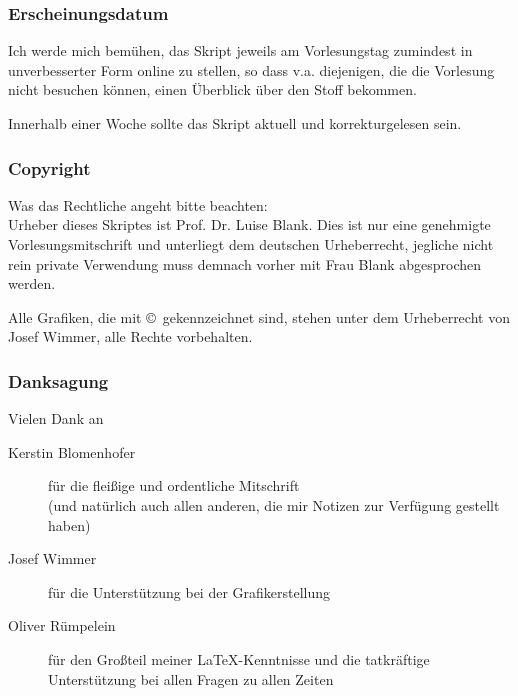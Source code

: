 \subsubsection{Erscheinungsdatum}
Ich werde mich bemühen, das Skript jeweils am Vorlesungstag zumindest in 
unverbesserter Form online zu stellen, so dass v.a. diejenigen, die die Vorlesung
nicht besuchen können, einen Überblick über den Stoff bekommen.

Innerhalb einer Woche sollte das Skript aktuell und korrekturgelesen sein.


\subsubsection{Copyright}
Was das Rechtliche angeht bitte beachten: \\
Urheber dieses Skriptes ist Prof. Dr. Luise Blank.
Dies ist nur eine genehmigte Vorlesungsmitschrift und unterliegt dem deutschen
Urheberrecht, jegliche nicht rein private Verwendung muss demnach vorher mit
Frau Blank abgesprochen werden.

Alle Grafiken, die mit \copyright ~gekennzeichnet sind, stehen unter
dem Urheberrecht von Josef Wimmer, alle Rechte vorbehalten.


\subsubsection*{Danksagung}
Vielen Dank an
\begin{description}
	\item[Kerstin Blomenhofer] für die fleißige und ordentliche Mitschrift\\
		(und natürlich auch allen anderen, die mir Notizen zur Verfügung gestellt haben)
	\item[Josef Wimmer] für die Unterstützung bei der Grafikerstellung
	\item[Oliver Rümpelein] für den Großteil meiner \LaTeX-Kenntnisse und
		die tatkräftige Unterstützung bei allen Fragen zu allen Zeiten
\end{description}

